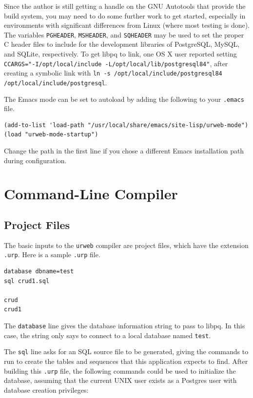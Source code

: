 \documentclass{article}
\begin{document}
Since the author is still getting a handle on the GNU Autotools that provide the build system, you may need to do some further work to get started, especially in environments with significant differences from Linux (where most testing is done).  The variables \texttt{PGHEADER}, \texttt{MSHEADER}, and \texttt{SQHEADER} may be used to set the proper C header files to include for the development libraries of PostgreSQL, MySQL, and SQLite, respectively.  To get libpq to link, one OS X user reported setting \texttt{CCARGS="-I/opt/local/include -L/opt/local/lib/postgresql84"}, after creating a symbolic link with \texttt{ln -s /opt/local/include/postgresql84 /opt/local/include/postgresql}.

The Emacs mode can be set to autoload by adding the following to your \texttt{.emacs} file.

\begin{verbatim}
(add-to-list 'load-path "/usr/local/share/emacs/site-lisp/urweb-mode")
(load "urweb-mode-startup")
\end{verbatim}

Change the path in the first line if you chose a different Emacs installation path during configuration.


\section{Command-Line Compiler}

\subsection{\label{cl}Project Files}

The basic inputs to the \texttt{urweb} compiler are project files, which have the extension \texttt{.urp}.  Here is a sample \texttt{.urp} file.

\begin{verbatim}
database dbname=test
sql crud1.sql

crud
crud1
\end{verbatim}

The \texttt{database} line gives the database information string to pass to libpq.  In this case, the string only says to connect to a local database named \texttt{test}.

The \texttt{sql} line asks for an SQL source file to be generated, giving the commands to run to create the tables and sequences that this application expects to find.  After building this \texttt{.urp} file, the following commands could be used to initialize the database, assuming that the current UNIX user exists as a Postgres user with database creation privileges:
\end{document}
